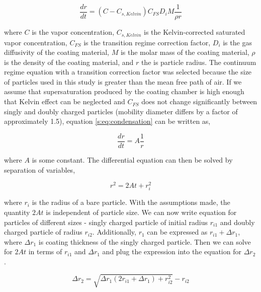 \documentclass[12pt]{article}
\begin{document}
\begin{equation}
    \frac{dr}{dt}=\left(C-C_{s,Kelvin}\right)C_{FS}D_iM\frac{1}{\rho r}
    \label{s:eq:condensation}
\end{equation}

\noindent where $C$ is the vapor concentration, $C_{s,Kelvin}$ is the Kelvin-corrected saturated vapor concentration, $C_{FS}$ is the transition regime correction factor, $D_i$ is the gas diffusivity of the coating material, $M$ is the molar mass of the coating material, $\rho$ is the density of the coating material, and $r$ the is particle radius. The continuum regime equation with a transition correction factor was selected because the size of particles used in this study is greater than the mean free path of air. If we assume that supersaturation produced by the coating chamber is high enough that Kelvin effect can be neglected and $C_{FS}$ does not change significantly between singly and doubly charged particles (mobility diameter differs by a factor of approximately 1.5), equation \ref{s:eq:condensation} can be written as,

\begin{equation}
    \frac{dr}{dt}=A\frac{1}{r}
\end{equation}

\noindent where $A$ is some constant. The differential equation can then be solved by separation of variables,

\begin{equation}
    r^2=2At+r_i^2
\end{equation}

\noindent where $r_i$ is the radius of a bare particle. With the assumptions made, the quantity $2At$ is independent of particle size. We can now write equation for particles of different sizes - singly charged particle of initial radius $r_{i1}$ and doubly charged particle of radius $r_{i2}$. Additionally, $r_1$ can be expressed as $r_{i1}+\Delta r_1$, where $\Delta r_1$ is coating thickness of the singly charged particle. Then we can solve for $2At$ in terms of $r_{i1}$ and $\Delta r_1$ and plug the expression into the equation for $\Delta r_2$.

\begin{equation}
    \Delta r_2=\sqrt{\Delta r_1\left(2r_{i1}+\Delta r_1\right)+r_{i2}^2}-r_{i2}
    \label{s:eq:thickness}
\end{equation}
\end{document}
